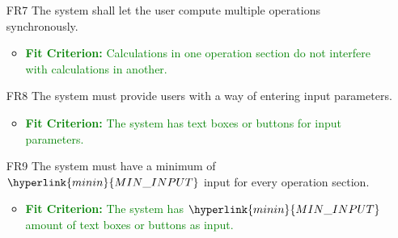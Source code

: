 \documentclass[12pt, titlepage]{article}
\begin{document}
\begin{enumerate}
\item [FR7] The system shall let the user compute multiple operations synchronously.
\begin{itemize}
  \item \textcolor{Green}{\textbf{Fit Criterion:} Calculations in one operation section do not interfere with calculations in another.}
\end{itemize}

\item [FR8] The system must provide users with a way of entering input parameters.
\begin{itemize}
  \item \textcolor{Green}{\textbf{Fit Criterion:} The system has text boxes or buttons for input parameters.}
\end{itemize}

\item [FR9] The system must have a minimum of $\hyperlink{minin}{MIN\_INPUT}$ input for every operation section.
\begin{itemize}
  \item \textcolor{Green}{\textbf{Fit Criterion:} The system has $\hyperlink{minin}{MIN\_INPUT}$  amount of text boxes or buttons as input.}
\end{itemize}


\end{enumerate}
\end{document}
